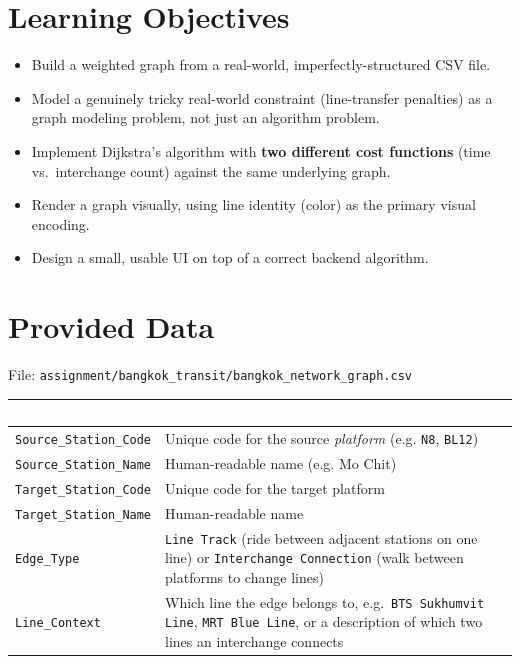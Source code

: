 \documentclass[11pt,a4paper]{article}
\begin{document}
\section{Learning Objectives}
\begin{itemize}
  \item Build a weighted graph from a real-world, imperfectly-structured CSV file.
  \item Model a genuinely tricky real-world constraint (line-transfer penalties)
        as a graph modeling problem, not just an algorithm problem.
  \item Implement Dijkstra's algorithm with \textbf{two different cost functions}
        (time vs.\ interchange count) against the same underlying graph.
  \item Render a graph visually, using line identity (color) as the primary
        visual encoding.
  \item Design a small, usable UI on top of a correct backend algorithm.
\end{itemize}

\section{Provided Data}

File: \texttt{assignment/bangkok\_transit/bangkok\_network\_graph.csv}

\renewcommand{\arraystretch}{1.25}
\begin{tabularx}{\linewidth}{@{}l X@{}}
  \toprule
  \rowcolor{kmutnbBlue!90}
  \textcolor{white}{\textbf{Column}} & \textcolor{white}{\textbf{Meaning}} \\
  \midrule
  \texttt{Source\_Station\_Code} & Unique code for the source \emph{platform} (e.g. \texttt{N8}, \texttt{BL12}) \\
  \rowcolor{lightGray}
  \texttt{Source\_Station\_Name} & Human-readable name (e.g. Mo Chit) \\
  \texttt{Target\_Station\_Code} & Unique code for the target platform \\
  \rowcolor{lightGray}
  \texttt{Target\_Station\_Name} & Human-readable name \\
  \texttt{Edge\_Type} & \texttt{Line Track} (ride between adjacent stations on one line) or \texttt{Interchange Connection} (walk between platforms to change lines) \\
  \rowcolor{lightGray}
  \texttt{Line\_Context} & Which line the edge belongs to, e.g.\ \texttt{BTS Sukhumvit Line}, \texttt{MRT Blue Line}, or a description of which two lines an interchange connects \\
  \bottomrule
\end{tabularx}
\end{document}
